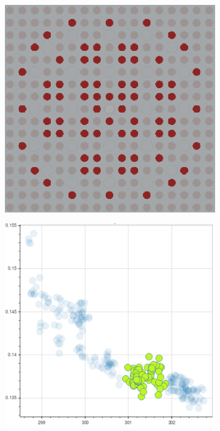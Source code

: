 \begin{figure}[h!]
\begin{subfigure}{0.45\textwidth}
  \caption{}
  \label{fig:chap10-fiss-mean-std-mgxs}
\end{subfigure}
\begin{subfigure}{0.45\textwidth}
  \centering
  \includegraphics[width=0.9\linewidth]{figures/unsupervised/features/assm-16/u235-fiss/mean-std/geometry-2}
  \caption{}
  \label{fig:chap10-fiss-mean-std-geom-2}
\end{subfigure}%
\begin{subfigure}{0.45\textwidth}
  \centering
  \includegraphics[width=0.9\linewidth]{figures/unsupervised/features/assm-16/u235-fiss/mean-std/mgxs-2}

\end{subfigure}
\end{figure}
